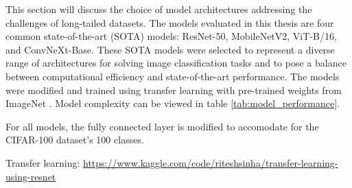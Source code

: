 
This section will discuss the choice of model architectures addressing the challenges of long-tailed datasets. The models evaluated in this thesis are four common state-of-the-art (SOTA) models: ResNet-50, MobileNetV2, ViT-B/16, and ConvNeXt-Base. These SOTA models were selected to represent a diverse range of architectures for solving image classification tasks and to pose a balance between computational efficiency and state-of-the-art performance. The models were modified and trained using transfer learning with pre-trained weights from ImageNet \cite{ILSVRC15}. Model complexity can be viewed in table \ref{tab:model_performance}.

For all models, the fully connected layer is modified to accomodate for the CIFAR-100 dataset's 100 classes.

Transfer learning:
\url{https://www.kaggle.com/code/riteshsinha/transfer-learning-using-resnet}


